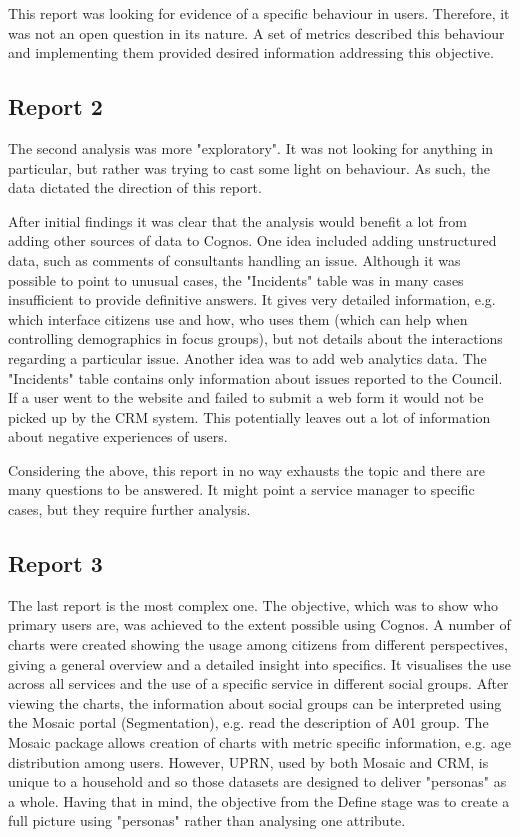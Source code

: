 This report was looking for evidence of a specific behaviour in users. Therefore, it was not an open question in its nature. A set of metrics described this behaviour and implementing them provided desired information addressing this objective.
		
		\subsection{Report 2}
		
The second analysis was more "exploratory". It was not looking for anything in particular, but rather was trying to cast some light on behaviour. As such, the data dictated the direction of this report.

After initial findings it was clear that the analysis would benefit a lot from adding other sources of data to Cognos. One idea included adding unstructured data, such as comments of consultants handling an issue. Although it was possible to point to unusual cases, the "Incidents" table was in many cases insufficient to provide definitive answers. It gives very detailed information, e.g. which interface citizens use and how, who uses them (which can help when controlling demographics in focus groups), but not details about the interactions regarding a particular issue. Another idea was to add web analytics data. The "Incidents" table contains only information about issues reported to the Council. If a user went to the website and failed to submit a web form it would not be picked up by the CRM system. This potentially leaves out a lot of information about negative experiences of users.

Considering the above, this report in no way exhausts the topic and there are many questions to be answered. It might point a service manager to specific cases, but they require further analysis.
		
		\subsection{Report 3}
		
The last report is the most complex one. The objective, which was to show who primary users are, was achieved to the extent possible using Cognos. A number of charts were created showing the usage among citizens from different perspectives, giving a general overview and a detailed insight into specifics. It visualises the use across all services and the use of a specific service in different social groups. After viewing the charts, the information about social groups can be interpreted using the Mosaic portal (Segmentation), e.g. read the description of A01 group. The Mosaic package allows creation of charts with metric specific information, e.g. age distribution among users. However, UPRN, used by both Mosaic and CRM, is unique to a household and so those datasets are designed to deliver "personas" as a whole. Having that in mind, the objective from the Define stage was to create a full picture using "personas" rather than analysing one attribute.

